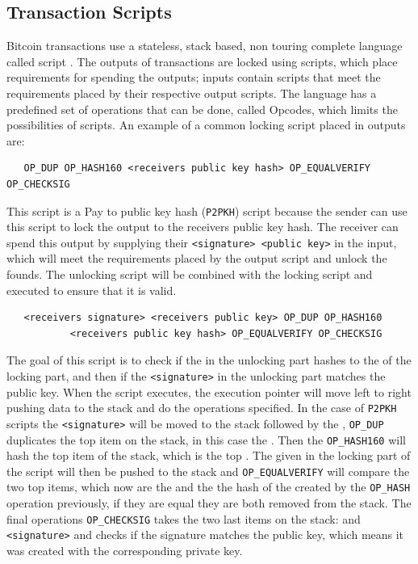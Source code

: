 \subsection{Transaction Scripts}
\label{subsec:scripts}

Bitcoin transactions use a stateless, stack based, non touring complete language called script \cite{antonopoulos2017mastering}.
The outputs of transactions are locked using scripts, which place requirements for spending the outputs; inputs contain scripts that meet the requirements placed by their respective output scripts. The language has a predefined set of operations that can be done, called Opcodes, which limits the possibilities of scripts. 
An example of a common locking script placed in outputs are: 

\begin{verbatim}
   OP_DUP OP_HASH160 <receivers public key hash> OP_EQUALVERIFY OP_CHECKSIG
\end{verbatim}


This script is a Pay to public key hash ({\tt P2PKH}) script because the sender can use this script to lock the output to the receivers public key hash. The receiver can spend this output by supplying their {\tt<signature> <public key>} in the input, which will meet the requirements placed by the output script and unlock the founds. The unlocking script will be combined with the locking script and executed to ensure that it is valid. 

\begin{verbatim}
   <receivers signature> <receivers public key> OP_DUP OP_HASH160 
           <receivers public key hash> OP_EQUALVERIFY OP_CHECKSIG
\end{verbatim}

The goal of this script is to check if the {\tt <public key>} in the unlocking part hashes to the {\tt  <public key hash>} of the locking part, and then if the {\tt <signature>} in the unlocking part matches the public key.
When the script executes, the execution pointer will move left to right pushing data to the stack and do the operations specified.
In the case of {\tt P2PKH} scripts the {\tt <signature>} will be moved to the stack followed by the {\tt <public key>}, {\tt OP\_DUP} duplicates the top item on the stack, in this case the {\tt <public key>}. Then the {\tt OP\_HASH160} will hash the top item of the stack, which is the top {\tt <public key>}. The {\tt <public key hash>} given in the locking part of the script will then be pushed to the stack and {\tt OP\_EQUALVERIFY} will compare the two top items, which now are the {\tt <public key hash>} and the the hash of the {\tt <public key>} created by the {\tt OP\_HASH} operation previously, if they are equal they are both removed from the stack. The final operations {\tt OP\_CHECKSIG} takes the two last items on the stack: {\tt <public key>} and {\tt <signature>} and checks if the signature matches the public key, which means it was created with the corresponding private key.
\\

